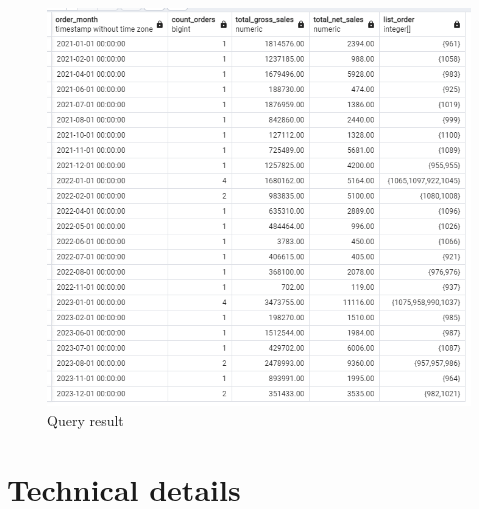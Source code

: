 \documentclass[]{report}
\begin{document}
\begin{figure}[htb]
	\centering
	\includegraphics[width=1.3\textwidth]{02_result_01}
	\caption{Query result}
	\label{fig:fig_09}
\end{figure}



\chapter{Technical details}
\end{document}
